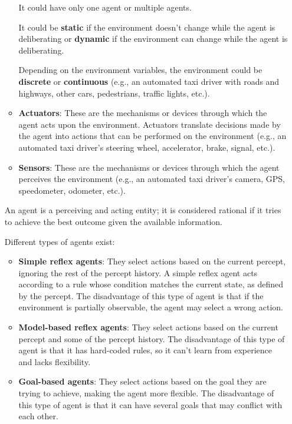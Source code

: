 \documentclass[12pt]{article}
\begin{document}
\begin{enumerate}[label=\textbf{A.\arabic*}]
\begin{itemize}
                    It could have only one agent or multiple agents.

                    It could be \textbf{static} if the environment doesn't change while the agent is deliberating or \textbf{dynamic} if the environment can change while the agent is deliberating.

                    Depending on the environment variables, the environment could be \textbf{discrete} or \textbf{continuous} (e.g., an automated taxi driver with roads and highways, other cars, pedestrians, traffic lights, etc.).

              \item \textbf{Actuators}: These are the mechanisms or devices through which the agent acts upon the environment. Actuators translate decisions made by the agent into actions that can be performed on the environment (e.g., an automated taxi driver's steering wheel, accelerator, brake, signal, etc.).

              \item \textbf{Sensors}: These are the mechanisms or devices through which the agent perceives the environment (e.g., an automated taxi driver's camera, GPS, speedometer, odometer, etc.).
          \end{itemize}

          An agent is a perceiving and acting entity; it is considered rational if it tries to achieve the best outcome given the available information.

          Different types of agents exist:

          \begin{itemize}
              \item \textbf{Simple reflex agents}: They select actions based on the current percept, ignoring the rest of the percept history. A simple reflex agent acts according to a rule whose condition matches the current state, as defined by the percept. The disadvantage of this type of agent is that if the environment is partially observable, the agent may select a wrong action.

              \item \textbf{Model-based reflex agents}: They select actions based on the current percept and some of the percept history. The disadvantage of this type of agent is that it has hard-coded rules, so it can't learn from experience and lacks flexibility.

              \item \textbf{Goal-based agents}: They select actions based on the goal they are trying to achieve, making the agent more flexible. The disadvantage of this type of agent is that it can have several goals that may conflict with each other.


\end{itemize}
\end{enumerate}
\end{document}
